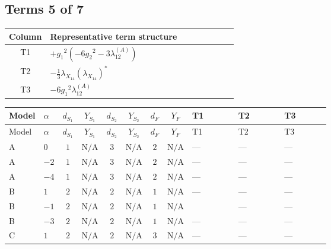 \documentclass[8pt]{article}
\begin{document}
\begin{landscape}
\subsection*{Terms 5 of 7}
\begin{center}
\begin{tabular}{@{}c >{\raggedright\arraybackslash}p{0.82\linewidth}@{}}
\toprule
Column & Representative term structure \\
\midrule
T1 & \(\displaystyle +{g_1}^2 \left(-6 {g_2}^2-3 {\lambda_{12}^{(A)}}\right)\) \\
\midrule
T2 & \(\displaystyle -\frac{1}{3} {\lambda_{X_{14}}} \left({\lambda_{X_{14}}}\right)^{*}\) \\
\midrule
T3 & \(\displaystyle -6 {g_1}^2 {\lambda_{12}^{(A)}}\) \\
\midrule
\bottomrule
\end{tabular}
\end{center}
\smallskip
\tiny
\begin{longtable}{@{}llcccccc >{\raggedright\arraybackslash}p{0.21\linewidth} >{\raggedright\arraybackslash}p{0.21\linewidth} >{\raggedright\arraybackslash}p{0.21\linewidth}@{}}
\toprule
Model & $\alpha$ & $d_{S_1}$ & $Y_{S_1}$ & $d_{S_2}$ & $Y_{S_2}$ & $d_F$ & $Y_F$ & T1 & T2 & T3 \\
\midrule
\endfirsthead
\toprule
Model & $\alpha$ & $d_{S_1}$ & $Y_{S_1}$ & $d_{S_2}$ & $Y_{S_2}$ & $d_F$ & $Y_F$ & T1 & T2 & T3 \\
\midrule
\endhead
A & $0$ & $1$ & $\text{N/A}$ & $3$ & $\text{N/A}$ & $2$ & $\text{N/A}$ & --- & --- & --- \\
\midrule
A & $-2$ & $1$ & $\text{N/A}$ & $3$ & $\text{N/A}$ & $2$ & $\text{N/A}$ & --- & --- & --- \\
\midrule
A & $-4$ & $1$ & $\text{N/A}$ & $3$ & $\text{N/A}$ & $2$ & $\text{N/A}$ & --- & --- & --- \\
\midrule
B & $1$ & $2$ & $\text{N/A}$ & $2$ & $\text{N/A}$ & $1$ & $\text{N/A}$ & --- & --- & --- \\
\midrule
B & $-1$ & $2$ & $\text{N/A}$ & $2$ & $\text{N/A}$ & $1$ & $\text{N/A}$ & \scriptsize\adjustbox{max width=\linewidth}{$\begin{gathered} +{g_1}^2 \left(-6 {g_2}^2-3 {\lambda_{12}^{(A)}}\right)\end{gathered}$} & --- & --- \\
\midrule
B & $-3$ & $2$ & $\text{N/A}$ & $2$ & $\text{N/A}$ & $1$ & $\text{N/A}$ & --- & --- & --- \\
\midrule
C & $1$ & $2$ & $\text{N/A}$ & $2$ & $\text{N/A}$ & $3$ & $\text{N/A}$ & --- & --- & --- \\

\end{longtable}
\end{landscape}
\end{document}
